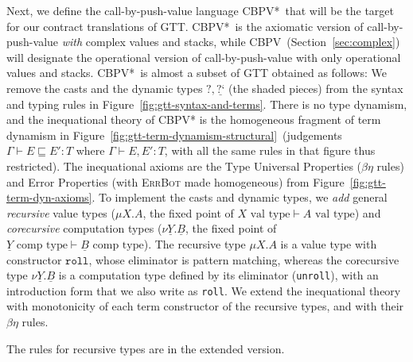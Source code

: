 \documentclass[acmsmall,nonacm]{acmart}
\newif\iflong
\renewcommand{\u}{\underline}
\newcommand{\cbpv}{CBPV}
\newcommand{\cbpvstar}{CBPV*}
\newcommand{\vtype}{\,\,\text{val type}}
\newcommand{\ctype}{\,\,\text{comp type}}
\newcommand{\ltdyn}{\sqsubseteq}
\newcommand{\dynv}{{?}}
\newcommand{\dync}{\u {\text{?`}}}
\begin{document}
Next, we define the call-by-push-value language \cbpvstar\ that will be
the target for our contract translations of GTT.
%
\cbpvstar\ is the axiomatic version of call-by-push-value \emph{with}
complex values and stacks, while \cbpv\ (Section~\ref{sec:complex}) will
designate the operational version of call-by-push-value with only
operational values and stacks.
%
\cbpvstar\ is almost a subset of GTT obtained as follows: We remove the
casts and the dynamic types $\dynv, \dync$ (the shaded pieces) from the
syntax and typing rules in Figure~\ref{fig:gtt-syntax-and-terms}.  There
is no type dynamism, and the inequational theory of \cbpv* is the
homogeneous fragment of term dynamism in
Figure~\ref{fig:gtt-term-dynamism-structural}\iflong\ and Figure~\ref{fig:gtt-term-dynamism-ext-congruence}\fi\ (judgements $\Gamma \vdash
E \ltdyn E' : T$ where $\Gamma \vdash E,E' : T$, with all the same rules
in that figure thus restricted).  The inequational axioms are the
Type Universal Properties ($\beta\eta$ rules)
and Error Properties (with \textsc{ErrBot} made homogeneous) from 
Figure~\ref{fig:gtt-term-dyn-axioms}.
%
To implement the casts and dynamic types, we \emph{add} general
\emph{recursive} value types ($\mu X.A$, the fixed point of $X \vtype
\vdash A \vtype$) and \emph{corecursive} computation types ($\nu \u Y.\u
B$, the fixed point of $\u Y \ctype \vdash \u B \ctype$).
%
The recursive type $\mu X.A$ is a value type with constructor
$\texttt{roll}$, whose eliminator is pattern matching, whereas the
corecursive type $\nu \u Y.\u B$ is a computation type defined by its
eliminator (\texttt{unroll}), with an introduction form that we also write
as \texttt{roll}.
%
We extend the inequational theory with monotonicity of each term constructor of
the recursive types, and with their $\beta\eta$ rules.
\begin{shortonly}
The rules for recursive types are in the extended version.
\end{shortonly}
\end{document}
